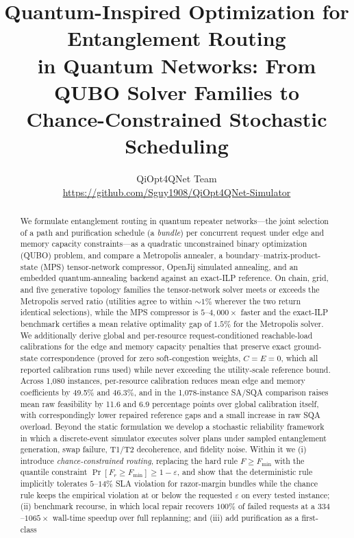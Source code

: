 \documentclass[twocolumn]{article}
\title{Quantum-Inspired Optimization for Entanglement Routing\\
in Quantum Networks: From QUBO Solver Families to\\
Chance-Constrained Stochastic Scheduling}
\author{QiOpt4QNet Team \\
\url{https://github.com/Sguy1908/QiOpt4QNet-Simulator}}
\begin{document}
\raggedbottom
\maketitle

\begin{abstract}
We formulate entanglement routing in quantum repeater networks---the
joint selection of a path and purification schedule (a \emph{bundle})
per concurrent request under edge and memory capacity
constraints---as a quadratic unconstrained binary optimization (QUBO)
problem, and compare a Metropolis annealer, a boundary--matrix-product-state
(MPS) tensor-network compressor, OpenJij simulated annealing, and an
embedded quantum-annealing backend against an exact-ILP reference.  On
chain, grid, and five generative topology families the tensor-network
solver meets or exceeds the Metropolis served ratio (utilities agree
to within $\sim\!1\%$ wherever the two return identical selections),
while the MPS compressor is $5$--$4{,}000\times$ faster and the
exact-ILP benchmark certifies a mean relative optimality gap of $1.5\%$
for the Metropolis solver.  We additionally derive global and per-resource
request-conditioned reachable-load calibrations for the edge and memory
capacity penalties that preserve exact ground-state correspondence
(proved for zero soft-congestion weights, $C=E=0$, which all reported
calibration runs used) while never exceeding the utility-scale
reference bound.  Across 1,080 instances,
per-resource calibration reduces mean edge and memory coefficients by 49.5\%
and 46.3\%, and in the 1,078-instance SA/SQA comparison raises mean raw
feasibility by 11.6 and 6.9 percentage points over global calibration
itself, with correspondingly lower repaired reference gaps and a small
increase in raw SQA overload.  Beyond the static formulation we
develop a stochastic reliability framework in which a discrete-event simulator
executes solver plans under sampled entanglement generation, swap
failure, T1/T2 decoherence, and fidelity noise.  Within it we (i)
introduce \emph{chance-constrained routing}, replacing the hard rule
$F \ge F_{\min}$ with the quantile constraint
$\Pr[F_r \ge F_{\min}] \ge 1-\varepsilon$, and show that the
deterministic rule implicitly tolerates $5$--$14\%$ SLA violation for
razor-margin bundles while the chance rule keeps the empirical
violation at or below the requested $\varepsilon$ on every tested
instance; (ii) benchmark recourse, in which local repair recovers
$100\%$ of failed requests at a $334$--$1065\times$ wall-time speedup
over full replanning; and (iii) add purification as a first-class

\end{abstract}
\end{document}
